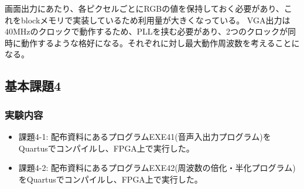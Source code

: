 画面出力にあたり、各ピクセルごとにRGBの値を保持しておく必要があり、これをblockメモリで実装しているため利用量が大きくなっている。
VGA出力は40MHzのクロックで動作するため、PLLを挟む必要があり、2つのクロックが同時に動作するような格好になる。それぞれに対し最大動作周波数を考えることになる。

\subsection{基本課題4}
\subsubsection{実験内容}
\begin{itemize}
    \item 課題4-1: 配布資料にあるプログラムEXE41(音声入出力プログラム)をQuartusでコンパイルし、FPGA上で実行した。
    \item 課題4-2: 配布資料にあるプログラムEXE42(周波数の倍化・半化プログラム)をQuartusでコンパイルし、FPGA上で実行した。
\end{itemize}
